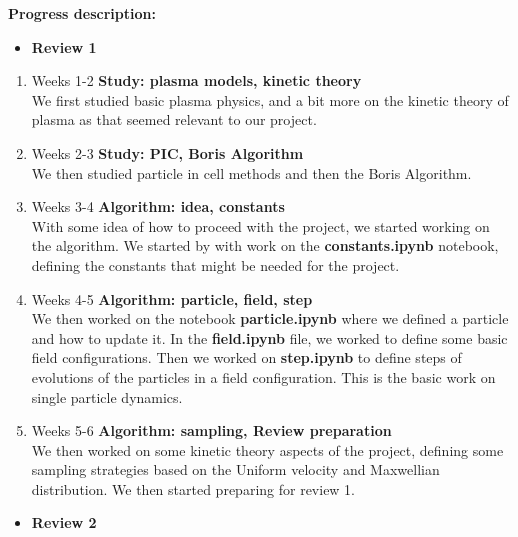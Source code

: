 \documentclass[12pt]{article}
\begin{document}
	\textbf{Progress description:}
	\begin{itemize}
		\item \textbf{Review 1}
	\end{itemize}
	\begin{enumerate}
		\item Weeks 1-2 \textbf{Study: plasma models, kinetic theory} \\
		We first studied basic plasma physics, and a bit more on the kinetic theory of plasma as that seemed relevant to our project.
		\item Weeks 2-3 \textbf{Study: PIC, Boris Algorithm} \\
		We then studied particle in cell methods and then the Boris Algorithm. 
		\item Weeks 3-4 \textbf{Algorithm: idea, constants}\\
		With some idea of how to proceed with the project, we started working on the algorithm. We started by with work on the \textbf{constants.ipynb} notebook, defining the constants that might be needed for the project.
		\item Weeks 4-5 \textbf{Algorithm: particle, field, step}\\
		We then worked on the notebook \textbf{particle.ipynb} where we defined a particle and how to update it. In the \textbf{field.ipynb} file, we worked to define some basic field configurations. Then we worked on \textbf{step.ipynb} to define steps of evolutions of the particles in a field configuration. This is the basic work on single particle dynamics.
		\item Weeks 5-6 \textbf{Algorithm: sampling, Review preparation}\\
		We then worked on some kinetic theory aspects of the project, defining some sampling strategies based on the Uniform velocity and Maxwellian distribution. We then started preparing for review 1.
	\end{enumerate}
	\begin{itemize}
		\item \textbf{Review 2}
	\end{itemize}
\end{document}

